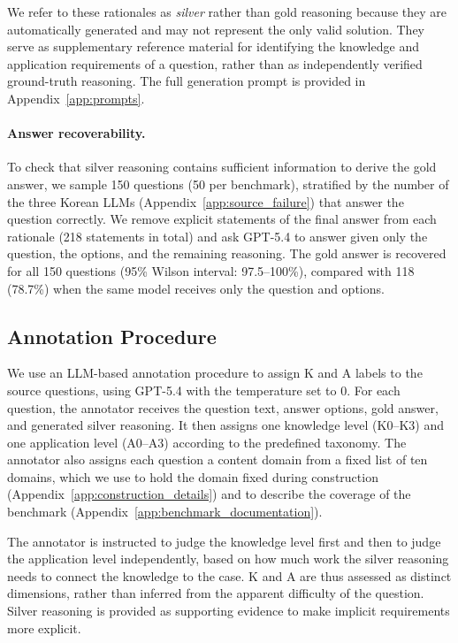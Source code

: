 We refer to these rationales as \textit{silver} rather than gold reasoning because they are automatically generated and may not represent the only valid solution.
They serve as supplementary reference material for identifying the knowledge and application requirements of a question, rather than as independently verified ground-truth reasoning.
The full generation prompt is provided in Appendix~\ref{app:prompts}.

\paragraph{Answer recoverability.}
To check that silver reasoning contains sufficient information to derive the gold answer, we sample 150 questions (50 per benchmark), stratified by the number of the three Korean LLMs (Appendix~\ref{app:source_failure}) that answer the question correctly.
We remove explicit statements of the final answer from each rationale (218 statements in total) and ask GPT-5.4 to answer given only the question, the options, and the remaining reasoning.
The gold answer is recovered for all 150 questions (95\% Wilson interval: 97.5--100\%), compared with 118 (78.7\%) when the same model receives only the question and options.

\subsection{Annotation Procedure}

We use an LLM-based annotation procedure to assign K and A labels to the source questions, using GPT-5.4 with the temperature set to 0.
For each question, the annotator receives the question text, answer options, gold answer, and generated silver reasoning.
It then assigns one knowledge level (K0--K3) and one application level (A0--A3) according to the predefined taxonomy.
The annotator also assigns each question a content domain from a fixed list of ten domains, which we use to hold the domain fixed during construction (Appendix~\ref{app:construction_details}) and to describe the coverage of the benchmark (Appendix~\ref{app:benchmark_documentation}).

The annotator is instructed to judge the knowledge level first and then to judge the application level independently, based on how much work the silver reasoning needs to connect the knowledge to the case.
K and A are thus assessed as distinct dimensions, rather than inferred from the apparent difficulty of the question.
Silver reasoning is provided as supporting evidence to make implicit requirements more explicit.

